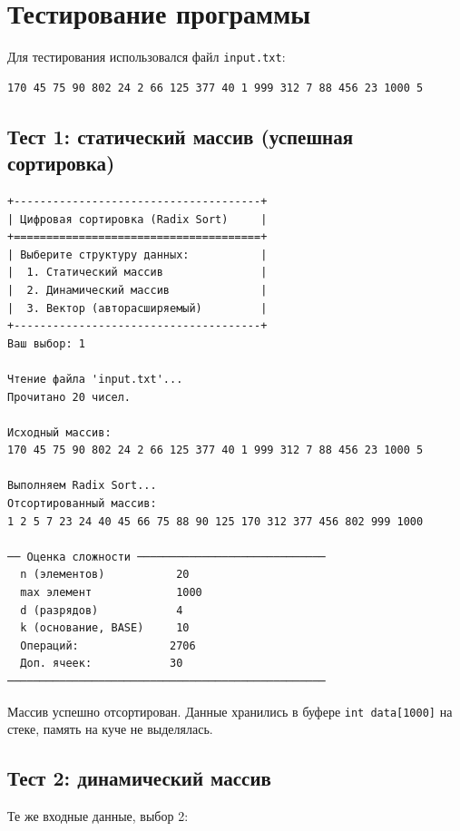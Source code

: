 \documentclass[a4paper,14pt]{extarticle}
\begin{document}
\newpage
\section{Тестирование программы}

Для тестирования использовался файл \texttt{input.txt}:
\begin{Verbatim}[frame=single,fontsize=\footnotesize]
170 45 75 90 802 24 2 66 125 377 40 1 999 312 7 88 456 23 1000 5
\end{Verbatim}

\subsection{Тест 1: статический массив (успешная сортировка)}

\begin{Verbatim}[frame=single,fontsize=\footnotesize]
+--------------------------------------+
| Цифровая сортировка (Radix Sort)     |
+======================================+
| Выберите структуру данных:           |
|  1. Статический массив               |
|  2. Динамический массив              |
|  3. Вектор (авторасширяемый)         |
+--------------------------------------+
Ваш выбор: 1

Чтение файла 'input.txt'...
Прочитано 20 чисел.

Исходный массив:
170 45 75 90 802 24 2 66 125 377 40 1 999 312 7 88 456 23 1000 5

Выполняем Radix Sort...
Отсортированный массив:
1 2 5 7 23 24 40 45 66 75 88 90 125 170 312 377 456 802 999 1000

── Оценка сложности ─────────────────────────────
  n (элементов)           20
  max элемент             1000
  d (разрядов)            4
  k (основание, BASE)     10
  Операций:              2706
  Доп. ячеек:            30
─────────────────────────────────────────────────
\end{Verbatim}

Массив успешно отсортирован. Данные хранились в буфере \texttt{int data[1000]} на стеке, память на куче не выделялась.

\subsection{Тест 2: динамический массив}

Те же входные данные, выбор 2:
\end{document}
